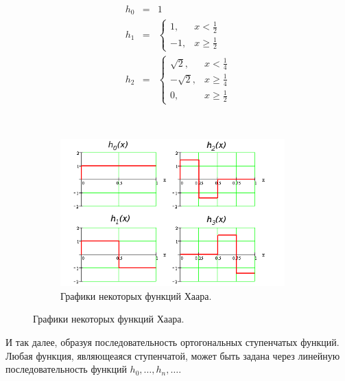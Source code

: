 \documentclass[12pt]{article}
\begin{document}
	\begin{figure}[H]
		\begin{subfigure}[c]{0.45\textwidth}
		\vspace{-40pt}
		\begin{eqnarray*}
			h_0& =& 1 \\		
			h_1& =& 
			\begin{cases}
				1, & x < \frac{1}{2} \\
				-1, & x \geq \frac{1}{2}
			\end{cases} \\		
			h_2& =& 
			\begin{cases}
				\sqrt{2}, & x < \frac{1}{4} \\
				-\sqrt{2}, & x \geq \frac{1}{4} \\
				0, & x \geq \frac{1}{2}
			\end{cases}
		\end{eqnarray*}
		\end{subfigure}
		~
		\begin{subfigure}[c]{0.55\textwidth}
			\includegraphics[width=0.95\textwidth]{../Graphics/Lectures-5-Haar_functions.png}
			\caption{Графики некоторых функций Хаара.}
		\end{subfigure}
	\end{figure}
	
	И так далее, образуя последовательность ортогональных ступенчатых функций. Любая функция, являющеаяся ступенчатой, может
	быть задана через линейную последовательность функций $h_0, \dots, h_n, \dots$.
\end{document}
